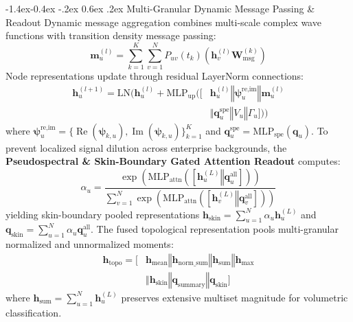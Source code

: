\documentclass[10pt,twocolumn,letterpaper]{article}
\makeatletter
\renewcommand\subsection{\@startsection{subsection}{2}{\z@}%
                                     {-1.4ex\@plus -0.4ex \@minus -.2ex}%
                                     {0.6ex \@plus .2ex}%
                                     {\normalfont\normalsize\bfseries}}
\makeatother
\begin{document}
\subsection{Multi-Granular Dynamic Message Passing \& Readout}
Dynamic message aggregation combines multi-scale complex wave functions with transition density message passing:
\begin{equation}
\mathbf{m}_u^{(l)} = \sum_{k=1}^K \sum_{v=1}^N P_{uv}(t_k) \left(\mathbf{h}_v^{(l)} \mathbf{W}_{\text{msg}}^{(k)}\right)
\end{equation}
Node representations update through residual LayerNorm connections:
\begin{align}
\mathbf{h}_u^{(l+1)} = \mathrm{LN}\Big(\mathbf{h}_u^{(l)} + \mathrm{MLP}_{\text{up}}\big([&\mathbf{h}_u^{(l)} \mathbin{\Vert} \boldsymbol{\psi}_u^{\text{re,im}} \mathbin{\Vert} \mathbf{m}_u^{(l)} \nonumber \\
&\mathbin{\Vert} \mathbf{q}_u^{\text{spe}} \mathbin{\Vert} V_u \mathbin{\Vert} \Gamma_u]\big)\Big)
\end{align}
where $\boldsymbol{\psi}_u^{\text{re,im}} = \{\operatorname{Re}(\boldsymbol{\psi}_{k, u}), \operatorname{Im}(\boldsymbol{\psi}_{k, u})\}_{k=1}^K$ and $\mathbf{q}_u^{\text{spe}} = \mathrm{MLP}_{\text{spe}}(\mathbf{q}_u)$. To prevent localized signal dilution across enterprise backgrounds, the \textbf{Pseudospectral \& Skin-Boundary Gated Attention Readout} computes:
\begin{equation}
\alpha_u = \frac{\exp(\mathrm{MLP}_{\text{attn}}([\mathbf{h}_u^{(L)} \mathbin{\Vert} \mathbf{q}_u^{\text{all}}]))}{\sum_{v=1}^N \exp(\mathrm{MLP}_{\text{attn}}([\mathbf{h}_v^{(L)} \mathbin{\Vert} \mathbf{q}_v^{\text{all}}]))}
\end{equation}
yielding skin-boundary pooled representations $\mathbf{h}_{\text{skin}} = \sum_{u=1}^N \alpha_u \mathbf{h}_u^{(L)}$ and $\mathbf{q}_{\text{skin}} = \sum_{u=1}^N \alpha_u \mathbf{q}_u^{\text{all}}$. The fused topological representation pools multi-granular normalized and unnormalized moments:
\begin{align}
\mathbf{h}_{\text{topo}} = \big[&\mathbf{h}_{\text{mean}} \mathbin{\Vert} \mathbf{h}_{\text{norm\_sum}} \mathbin{\Vert} \mathbf{h}_{\text{sum}} \mathbin{\Vert} \mathbf{h}_{\text{max}} \nonumber \\
&\mathbin{\Vert} \mathbf{h}_{\text{skin}} \mathbin{\Vert} \mathbf{q}_{\text{summary}} \mathbin{\Vert} \mathbf{q}_{\text{skin}}\big]
\end{align}
where $\mathbf{h}_{\text{sum}} = \sum_{u=1}^N \mathbf{h}_u^{(L)}$ preserves extensive multiset magnitude for volumetric classification.
\end{document}
